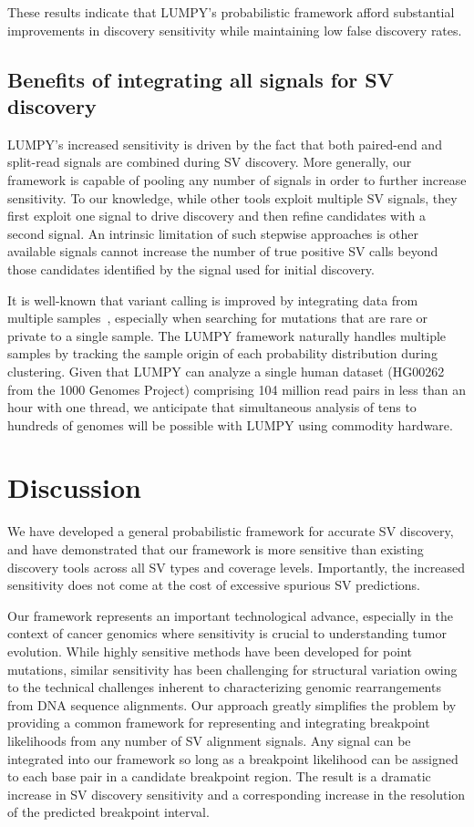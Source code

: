 \documentclass[10pt]{bmc_article}
\newenvironment{bmcformat}{\begin{raggedright}\baselineskip20pt\sloppy\setboolean{publ}{false}}{\end{raggedright}\baselineskip20pt\sloppy}
\begin{document}
\begin{bmcformat}
These results indicate that LUMPY’s probabilistic framework afford substantial
improvements in discovery sensitivity while maintaining low false discovery
rates.

\subsection*{Benefits of integrating all signals for SV discovery}

LUMPY's increased sensitivity is driven by the fact that both paired-end and
split-read signals are combined during SV discovery. More generally, our
framework is capable of pooling any number of signals in order to further
increase sensitivity. To our knowledge, while other tools exploit multiple SV
signals, they first exploit one signal to drive discovery and then refine
candidates with a second signal. An intrinsic limitation of such stepwise
approaches is other available signals cannot increase the number of true
positive SV calls beyond those candidates identified by the signal used for
initial discovery. 

It is well-known that variant calling is improved by integrating data from
multiple samples~\cite{handsaker2011, mckenna2010, hormozdiari2011,
quinlan2011}, especially when searching for mutations that are rare or private
to a single sample. The LUMPY framework naturally handles multiple samples by
tracking the sample origin of each probability distribution during clustering.
Given that LUMPY can analyze a single human dataset (HG00262 from the 1000
Genomes Project) comprising 104 million read pairs in less than an hour with one
thread, we anticipate that simultaneous analysis of tens to hundreds of genomes
will be possible with LUMPY using commodity hardware.

\section*{Discussion}
We have developed a general probabilistic framework for accurate SV discovery,
and have demonstrated that our framework is more sensitive than existing
discovery tools across all SV types and coverage levels. Importantly, the
increased sensitivity does not come at the cost of excessive spurious SV
predictions.

Our framework represents an important technological advance, especially in the
context of cancer genomics where sensitivity is crucial to understanding tumor
evolution. While highly sensitive methods have been developed for point
mutations, similar sensitivity has been challenging for structural variation
owing to the technical challenges inherent to characterizing genomic
rearrangements from DNA sequence alignments. Our approach greatly simplifies the
problem by providing a common framework for representing and integrating
breakpoint likelihoods from any number of SV alignment signals. Any signal can
be integrated into our framework so long as a breakpoint likelihood can be
assigned to each base pair in a candidate breakpoint region. The result is a
dramatic increase in SV discovery sensitivity and a corresponding increase in
the resolution of the predicted breakpoint interval.


\end{bmcformat}
\end{document}
